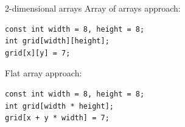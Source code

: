 
\begin{frame}[fragile]{2-dimensional arrays}
    Array of arrays approach:
    \begin{lstlisting}
const int width = 8, height = 8;
int grid[width][height];
grid[x][y] = 7;
    \end{lstlisting}
    \pause
    Flat array approach:
    \begin{lstlisting}
const int width = 8, height = 8;
int grid[width * height];
grid[x + y * width] = 7;
    \end{lstlisting}
\end{frame}

